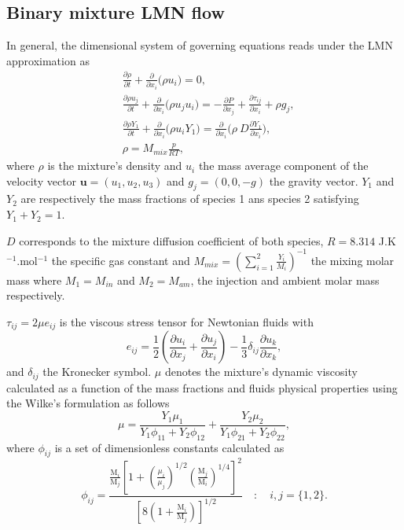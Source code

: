 \subsection{Binary mixture LMN flow}

In general, the dimensional system of governing equations reads under the LMN approximation as
\begin{align}
&\frac{\partial {\rho}}{\partial t}+\frac{\partial }{\partial x_i} \bigg({\rho} {u}_i\bigg) = 0, \label{mass}\\
&\frac{\partial {\rho}{ u}_j }{\partial t}+ \frac{\partial }{\partial x_i} \bigg({\rho} {u}_j {u}_i \bigg) =-\frac{\partial{ P}}{\partial x_j} + \frac{\partial{\tau}_{ij}}{\partial x_i}+{\rho} g_j, \label{mom}\\
&  \frac{\partial{\rho}{ Y}_1}{\partial t}+ \frac{\partial }{\partial x_i} \bigg({\rho} {u}_i {Y}_1\bigg)=\frac{\partial }{\partial x_i}\bigg( {\rho} \  D \frac{\partial {Y }_1}{\partial x_i}\bigg),\label{spec}\\
&{\rho}={M}_{mix}\frac{p}{RT}, \label{state}
\end{align}
where ${\rho}$ is the mixture's density and ${u}_i$ the mass average component of the velocity vector ${\textbf{u}}=({u}_1,{u}_2,{u}_3)$ and $g_j=(0,0,-g)$ the gravity vector. ${Y}_1$ and ${Y}_2$  are respectively the mass fractions of species 1 ans species 2 satisfying ${Y}_1+{Y}_2=1$.

$D$ corresponds to the mixture diffusion coefficient of both species,  $R= 8.314$ J.K$^{-1}$.mol$^{-1}$ the specific gas constant and $M_{mix}=\displaystyle\left(\sum_{i=1}^2  \frac{{Y}_i}{M_i}\right)^{-1}$ the mixing molar mass where  $M_1=M_{in}$ and $M_2 =M_{am}$, the injection and ambient molar mass respectively.

 ${\tau}_{ij}= 2\mu{e}_{ij}$ is the viscous stress tensor for Newtonian fluids with
$${e}_{ij}= \frac{1}{2}\left(\frac{\partial  u_i}{\partial x_j} + \frac{\partial u_j}{\partial x_i}\right) -\frac{1}{3}\delta_{ij}\frac{\partial u_k}{\partial x_k},$$
and $\delta_{ij}$ the Kronecker symbol.  $\mu$ denotes the mixture's dynamic viscosity calculated as a function of the mass fractions and fluids physical properties using the Wilke's formulation as follows
\begin{equation}\label{wilke}
        \mu = \frac{Y_1\mu_1}{Y_1\phi_{11}+Y_2\phi_{12}}+\frac{Y_2\mu_2}{Y_1\phi_{21}+Y_2\phi_{22}},
\end{equation}
        where $\phi_{ij}$ is a set of dimensionless constants calculated as
\begin{equation}
        \phi_{ij}= \displaystyle\frac{\displaystyle\frac{\textrm{M}_i}{\textrm{M}_j}\left[ 1+\left(\displaystyle\frac{\mu_i}{\mu_j} \right)^{1/2} \left( \displaystyle\frac{\textrm{M}_j}{\textrm{M}_i} \right)^{1/4}\right]^2}{ \left[ 8\left(1+\displaystyle\frac{\textrm{M}_i}{\textrm{M}_j} \right) \right]^{1/2}}\quad : \quad i,j=\{1,2\}.
\end{equation}

